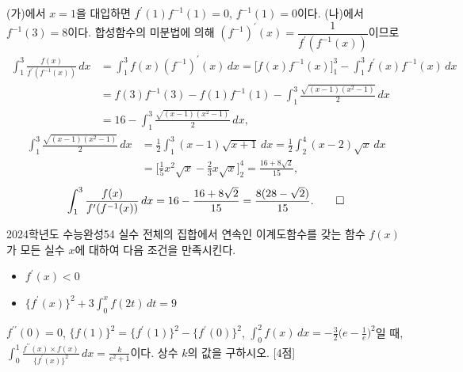 \documentclass{article}
\begin{document}
\begin{sol}
	(가)에서 $x=1$을 대입하면 $f^{\prime}(1)f^{-1}(1)=0$, $f^{-1}(1)=0$이다. (나)에서 $f^{-1}(3)=8$이다. 합성함수의 미분법에 의해 $(f^{-1})^{\prime}(x)=\dfrac{1}{f^{\prime}(f^{-1}(x))}$이므로
	\[
		\begin{aligned}
			\int_1^3\frac{f(x)}{f^{\prime}(f^{-1}(x))}\,dx&=\int_1^3f(x)(f^{-1})^{\prime}(x)\,dx=\biggl[f(x)f^{-1}(x)\biggr]_1^3-\int_1^3f^{\prime}(x)f^{-1}(x)\,dx\\[3pt]
			&=f(3)f^{-1}(3)-f(1)f^{-1}(1)-\int_1^3\frac{\sqrt{(x-1)(x^2-1)}}{2}\,dx\\[3pt]
			&=16-\int_1^3\frac{\sqrt{(x-1)(x^2-1)}}{2}\,dx,
		\end{aligned}
	\]
	\[
		\begin{aligned}
			\int_1^3\frac{\sqrt{(x-1)(x^2-1)}}{2}\,dx&=\frac{1}{2}\int_1^3(x-1)\sqrt{x+1}\,dx=\frac{1}{2}\int_2^4(x-2)\sqrt{x}\,dx\\[3pt]
			&=\biggl[\frac{1}{5}x^2\sqrt{x}-\frac{2}{3}x\sqrt{x}\biggr]_2^4=\frac{16+8\sqrt2}{15},
		\end{aligned}
	\]
	\[
		\int_1^3\frac{f(x)}{f^{\prime}(f^{-1}(x))}\,dx=16-\frac{16+8\sqrt2}{15}=\frac{8(28-\sqrt2)}{15}.\qed
	\]
\end{sol}

\newpage
\begin{prob}{2024학년도 수능완성}{54}
	실수 전체의 집합에서 연속인 이계도함수를 갖는 함수 $f(x)$가 모든 실수 $x$에 대하여 다음 조건을 만족시킨다.
	\begin{hint}
		\begin{itemize}
			\item[(가)] $f^{\prime}(x)<0$
			\item[(나)] $\{f^{\prime}(x)\}^2+3\displaystyle\int_0^xf(2t)\,dt=9$
		\end{itemize}
	\end{hint}
	$f^{\prime\prime}(0)=0$, $\{f(1)\}^2=\{f^{\prime}(1)\}^2-\{f^{\prime}(0)\}^2$, $\displaystyle\int_0^2f(x)\,dx=-\frac{3}{2}\biggl(e-\frac{1}{e}\biggr)^2$일 때, $\displaystyle\int_0^1\frac{f^{\prime\prime}(x)\times f(x)}{\{f^{\prime}(x)\}^2}\,dx=\frac{k}{e^2+1}$이다. 상수 $k$의 값을 구하시오. [4점]
\end{prob}
\end{document}
